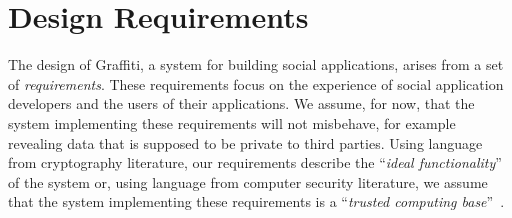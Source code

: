 \newtheorem{requirement}{Requirement}

\section{Design Requirements}

The design of Graffiti,
a system for building social applications,
arises from a set of \emph{requirements}.
These requirements focus on the experience of social application developers
and the users of their applications.
We assume, for now, that the system implementing these requirements
will not misbehave, for example revealing data that is supposed to be private to third parties.
Using language from cryptography literature,
our requirements describe the
``\emph{ideal functionality}''~\cite{universallycomposable}
of the system or, using language from computer security literature,
we assume that the system implementing these requirements is a ``\emph{trusted computing base}''~\cite{tcb}.



